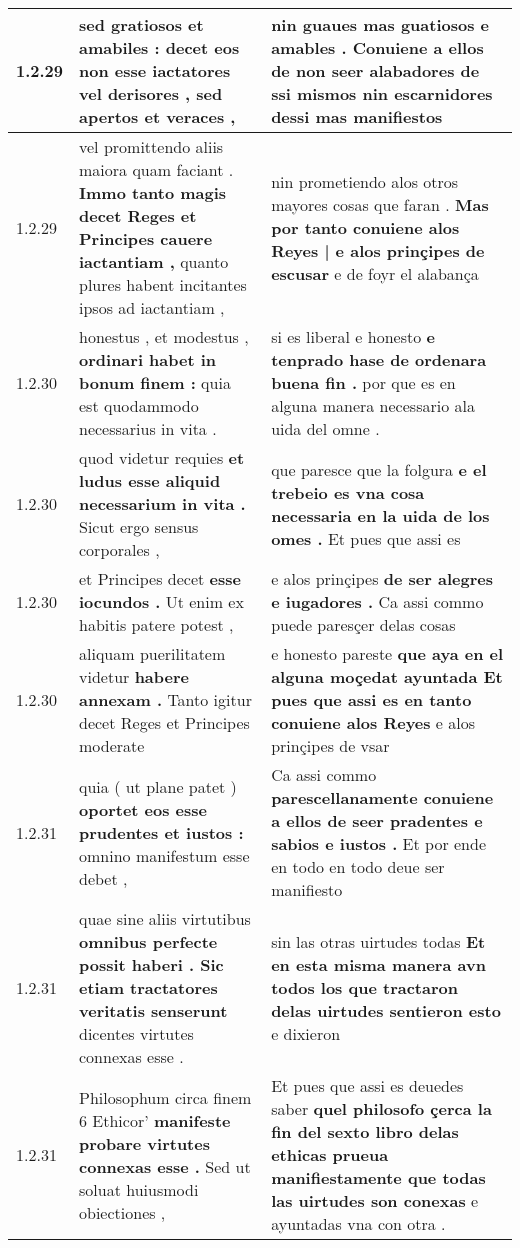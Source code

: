 \begin{tabular}{|p{1cm}|p{6.5cm}|p{6.5cm}|}
1.2.29 & sed gratiosos et amabiles : \textbf{ decet eos non esse iactatores vel derisores , } sed apertos et veraces , & nin guaues mas guatiosos e amables . \textbf{ Conuiene a ellos de non seer alabadores de ssi mismos } nin escarnidores dessi mas manifiestos \\\hline
1.2.29 & vel promittendo aliis maiora quam faciant . \textbf{ Immo tanto magis decet Reges et Principes cauere iactantiam , } quanto plures habent incitantes ipsos ad iactantiam , & nin prometiendo alos otros mayores cosas que faran . \textbf{ Mas por tanto conuiene alos Reyes | e alos prinçipes de escusar } e de foyr el alabança \\\hline
1.2.30 & honestus , et modestus , \textbf{ ordinari habet in bonum finem : } quia est quodammodo necessarius in vita . & si es liberal e honesto \textbf{ e tenprado hase de ordenara buena fin . } por que es en alguna manera necessario ala uida del omne . \\\hline
1.2.30 & quod videtur requies \textbf{ et ludus esse aliquid necessarium in vita . } Sicut ergo sensus corporales , & que paresce que la folgura \textbf{ e el trebeio es vna cosa necessaria en la uida de los omes . } Et pues que assi es \\\hline
1.2.30 & et Principes decet \textbf{ esse iocundos . } Ut enim ex habitis patere potest , & e alos prinçipes \textbf{ de ser alegres e iugadores . } Ca assi commo puede paresçer delas cosas \\\hline
1.2.30 & aliquam puerilitatem videtur \textbf{ habere annexam . } Tanto igitur decet Reges et Principes moderate & e honesto pareste \textbf{ que aya en el alguna moçedat ayuntada Et pues que assi es en tanto conuiene alos Reyes } e alos prinçipes de vsar \\\hline
1.2.31 & quia ( ut plane patet ) \textbf{ oportet eos esse prudentes et iustos : } omnino manifestum esse debet , & Ca assi commo \textbf{ parescellanamente conuiene a ellos de seer pradentes e sabios e iustos . } Et por ende en todo en todo deue ser manifiesto \\\hline
1.2.31 & quae sine aliis virtutibus \textbf{ omnibus perfecte possit haberi . Sic etiam tractatores veritatis senserunt } dicentes virtutes connexas esse . & sin las otras uirtudes todas \textbf{ Et en esta misma manera avn todos los que tractaron delas uirtudes sentieron esto } e dixieron \\\hline
1.2.31 & Philosophum circa finem 6 Ethicor’ \textbf{ manifeste probare virtutes connexas esse . } Sed ut soluat huiusmodi obiectiones , & Et pues que assi es deuedes saber \textbf{ quel philosofo çerca la fin del sexto libro delas ethicas prueua manifiestamente que todas las uirtudes son conexas } e ayuntadas vna con otra . \\\hline

\end{tabular}
